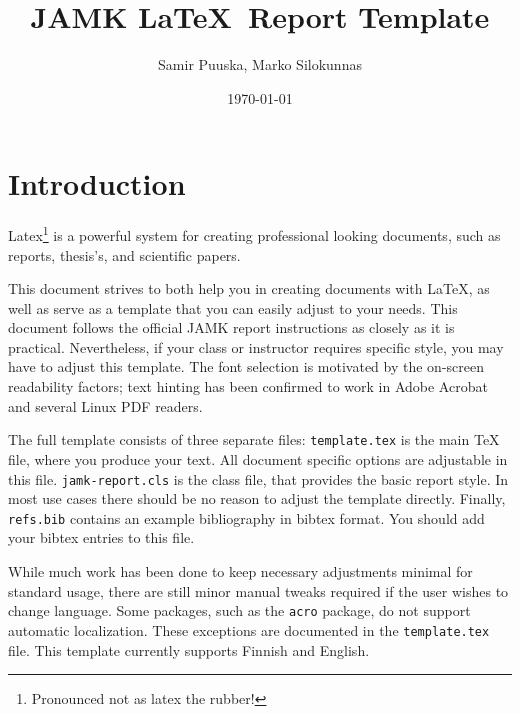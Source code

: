 \documentclass[english]{jamk-report}
\title{JAMK \LaTeX\ Report Template}
\author{Samir Puuska, Marko Silokunnas}
\date{\today}
\begin{document}
\frontmatter      %


\maketitle        %



\makeabstract     %
\makeabstractfin

\tableofcontents  %

\listoffigures    %
\listoftables

\printacronyms[include-classes=abbrev,name=Abbreviations]

\mainmatter       %



\section{Introduction}

Latex\footnote{Pronounced not as latex the rubber!} is a powerful system
for creating professional looking documents, such as reports, thesis's, and
scientific papers.

This document strives to both help you in creating documents with \LaTeX, %
as well as serve as a template that you can easily adjust to your needs.
This document follows the official JAMK report instructions as closely
as it is practical. Nevertheless, if your class or instructor requires
specific style, you may have to adjust this template. The font selection
is motivated by the on-screen readability factors; text hinting has
been confirmed to work in Adobe Acrobat and several Linux PDF readers.

The full template consists of three separate files: \texttt{template.tex}
is the main TeX file, where you produce your text. All document specific
options are adjustable in this file. \texttt{jamk-report.cls}
is the class file, that provides the basic report style. In most use cases there should be
no reason to adjust the template directly. Finally, \texttt{refs.bib} contains
an example bibliography in bibtex format. You should add your bibtex entries to this file.

While much work has been done to keep necessary adjustments minimal for
standard usage, there are still minor manual tweaks required if the user
wishes to change language. Some packages, such as the \texttt{acro} package,
do not support automatic localization. These exceptions are documented in the
\texttt{template.tex} file. This template currently supports Finnish and English.
\end{document}
